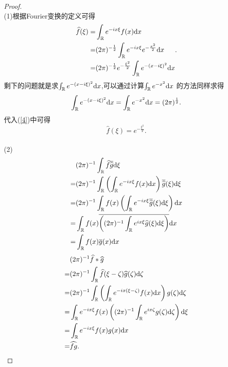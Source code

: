\begin{proof}\\
  (1)根据Fourier变换的定义可得
  \begin{equation}\label{4}
    \begin{aligned}
    \widehat{f}(\xi)=&\int_{\mathbb{R}}e^{-ix\xi}f(x)\mathrm{d}x\\
    =& (2\pi)^{-\frac{1}{2}} \int_{\mathbb{R}}e^{-ix\xi}e^{-\frac{x^2}{2}}\mathrm{d}x\\
    =&(2\pi)^{-\frac{1}{2}}e^{-\frac{\xi^2}{2}}\int_{\mathbb{R}} e^{-(x-i\xi)^2}\mathrm{d}x
    \end{aligned}
  .\end{equation}
  剩下的问题就是求$\int_{\mathbb{R}}e^{-(x-i\xi)^2}\mathrm{d}x$,可以通过计算$\int_{\mathbb{R}}e^{-x^2}\mathrm{d}x$ 的方法同样求得
  \[
    \int_{\mathbb{R}}e^{-(x-i\xi)^2}\mathrm{d}x=\int_{\mathbb{R}}e^{-x^2}\mathrm{d}x=(2\pi)^{\frac{1}{2}}.
  \] 
  代入(\ref{4})中可得
  \[
    \widehat{f}(\xi)=e^{-\frac{\xi^2}{2}}.
  \]\\
  (2)
  \begin{equation*}
    \begin{aligned} 
    &(2\pi)^{-1}\int_{\mathbb{R}}\widehat{f}\overline{\widehat{g}}\mathrm{d}\xi\\
    =& (2\pi)^{-1}\int_{\mathbb{R}}\left( \int_{\mathbb{R}}e^{-ix\xi}f(x)\mathrm{d}x \right) \overline{\widehat{g}}(\xi)\mathrm{d}\xi\\
    =& (2\pi)^{-1}\int_{\mathbb{R}}f(x)\left( \int_{\mathbb{R}}e^{-ix\xi}\overline{\widehat{g}}(\xi)\mathrm{d}\xi \right) \mathrm{d}x\\
    =& \int_{\mathbb{R}}f(x)\overline{\left( (2\pi)^{-1}\int_{\mathbb{R}}e^{ix\xi} \widehat{g}(\xi)\mathrm{d}\xi \right) }\mathrm{d}x\\
    =& \int_{\mathbb{R}}f(x)\overline{g}(x)\mathrm{d}x
    \end{aligned}
  \end{equation*}
\begin{equation*}
  \begin{aligned}
    &(2\pi)^{-1} \widehat{f}*\widehat{g}\\
    =&(2\pi)^{-1} \int_{\mathbb{R}}\widehat{f}(\xi-\zeta)\widehat{g}(\zeta)\mathrm{d}\zeta\\
    =& (2\pi)^{-1}\int_{\mathbb{R}}\left( \int_{\mathbb{R}}e^{-ix(\xi-\zeta)}f(x)\mathrm{d}x \right)g(\zeta)\mathrm{d}\zeta\\
    =& \int_{\mathbb{R}}e^{-ix\xi}f(x)\left( (2\pi)^{-1}\int_{\mathbb{R}}e^{ix\zeta}g(\zeta)\mathrm{d}\zeta \right) \mathrm{d}\xi\\
    = & \int_{\mathbb{R}}e^{-ix\xi}f(x)g(x)\mathrm{d}x\\
    =& \widehat{fg}.
  \end{aligned}
\end{equation*}
\end{proof}



